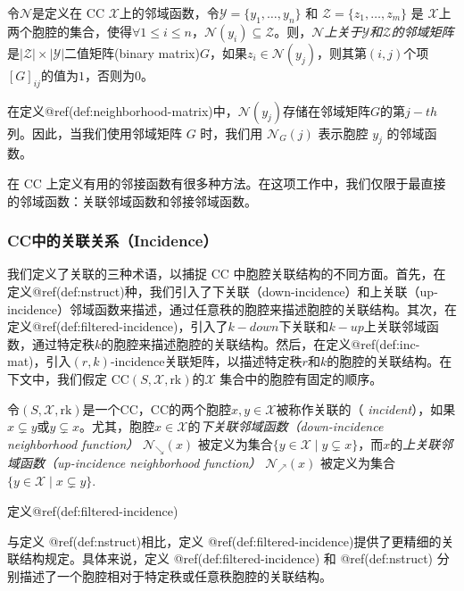 \documentclass[
  12pt,
]{krantz}
\begin{document}
\label{neighborhood-matrix}
令\(\mathcal{N}\)是定义在 CC
\(\mathcal{X}\)上的邻域函数，令\(\mathcal{Y}=\{y_1,\ldots,y_n\}\) 和
\(\mathcal{Z}=\{z_1,\ldots,z_m\}\) 是
\(\mathcal{X}\)上两个胞腔的集合，使得\(\forall 1\leq i \leq n，\mathcal{N}(y_{i}) \subseteq \mathcal{Z}\)。则，\emph{\(\mathcal{N}\)上关于\(\mathcal{Y}\)和\(\mathcal{Z}\)的邻域矩阵}是\(|\mathcal{Z}| \times|\mathcal{Y}|\)二值矩阵(binary
matrix)\(G\)，如果\(z_i\in \mathcal{N}(y_j)\)，则其第\((i,j)\)个项\([G]_{ij}\)的值为\(1\)，否则为\(0\)。

在定义@ref(def:neighborhood-matrix)中，\(\mathcal{N}(y_j)\)存储在邻域矩阵\(G\)的第\(j-th\)列。因此，当我们使用邻域矩阵
\(G\) 时，我们用 \(\mathcal{N}_{G}(j)\) 表示胞腔 \(y_j\) 的邻域函数。

在 CC
上定义有用的邻接函数有很多种方法。在这项工作中，我们仅限于最直接的邻域函数：关联邻域函数和邻接邻域函数。

\subsubsection{CC中的关联关系（Incidence）}\label{incidence-in-a-cc}

我们定义了关联的三种术语，以捕捉 CC
中胞腔关联结构的不同方面。首先，在定义@ref(def:nstruct)种，我们引入了下关联（down-incidence）和上关联（up-incidence）邻域函数来描述，通过任意秩的胞腔来描述胞腔的关联结构。其次，在定义@ref(def:filtered-incidence)，引入了\(k-down\)下关联和\(k-up\)上关联邻域函数，通过特定秩\(k\)的胞腔来描述胞腔的关联结构。然后，在定义@ref(def:inc-mat)，引入\((r, k)\)-incidence关联矩阵，以描述特定秩\(r\)和\(k\)的胞腔的关联结构。在下文中，我们假定
CC\((S,\mathcal{X}, \mbox{rk})\)的\(\mathcal{X}\)
集合中的胞腔有固定的顺序。

\label{nstruct}
令\((S,\mathcal{X}, \mbox{rk})\)是一个CC，CC的两个胞腔\(x, y\in\mathcal{X}\)被称作关联的（
\emph{incident}），如果\(x \subsetneq y\)或\(y \subsetneq x\)。尤其，胞腔\(x\in\mathcal{X}\)的\emph{下关联邻域函数（down-incidence
neighborhood function）} \(\mathcal{N}_{\searrow}(x)\)
被定义为集合\(\{ y\in \mathcal{X} \mid y \subsetneq x\}\)，而\(x\)的\emph{上关联邻域函数（up-incidence
neighborhood function）} \(\mathcal{N}_{\nearrow}(x)\) 被定义为集合
\(\{ y\in \mathcal{X} \mid x \subsetneq y\}\).

定义@ref(def:filtered-incidence)

与定义 @ref(def:nstruct)相比，定义
@ref(def:filtered-incidence)提供了更精细的关联结构规定。具体来说，定义
@ref(def:filtered-incidence) 和 @ref(def:nstruct)
分别描述了一个胞腔相对于特定秩或任意秩胞腔的关联结构。
\end{document}
